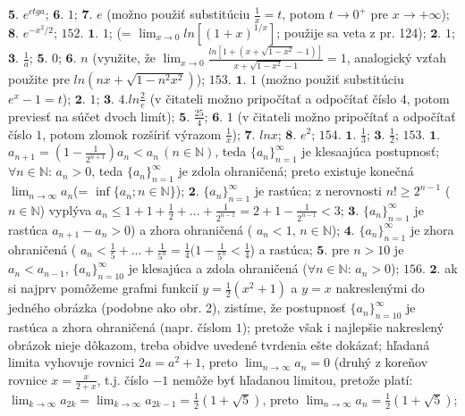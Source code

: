 $\boldsymbol{5.}$  $e^{ctg a} $;
$\boldsymbol{6.}$  $1 $;
$\boldsymbol{7.}$  $e $ (možno použiť substitúciu $\frac{1}{x}=t $, potom $t\rightarrow 0^{+} $ pre $x \rightarrow +\infty $);
$\boldsymbol{8.}$  $e^{-x^{2}/2} $;
$\boxed{152.}$
$\boldsymbol{1.}$  $1 $; (= $\lim_{x\rightarrow 0} ln[(1+x)^{1/x}  ] $; použije sa veta z pr. 124);
$\boldsymbol{2.}$  $1 $;
$\boldsymbol{3.}$  $\frac{1}{a} $; 
$\boldsymbol{5.}$  $0 $;
$\boldsymbol{6.}$  $n $ (využite, že $\lim_{x\rightarrow 0} \frac {ln [1+(x+ \sqrt{1-x^{2}}-1)]}{x+\sqrt{1-x^{2}}-1} =1$, analogický vzťah použite pre $ln (nx+ \sqrt{1-n^{2}x^{2}}) $);   
$\boxed{153.}$
$\boldsymbol{1.}$  $1 $ (možno použiť substitúciu  $e^{x}-1=t  $);
$\boldsymbol{2.}$  $1 $;
$\boldsymbol{3.}$  $4. ln \frac{2}{e} $ (v čitateli možno pripočítať a odpočítať číslo $4$, potom previesť na súčet dvoch limít);
$\boldsymbol{5.}$  $\frac{25}{4} $;
$\boldsymbol{6.}$  $1 $ (v čitateli možno pripočítať a odpočítať číslo $1$, potom zlomok rozšíriť výrazom $\frac{1}{x}$);
$\boldsymbol{7.}$  $ln x $;
$\boldsymbol{8.}$  $e^{2} $;
$\boxed{154.}$
$\boldsymbol{1.}$  $\frac{1}{3} $;
$\boldsymbol{3.}$  $\frac{1}{2} $;
$\boxed{153.}$
$\boldsymbol{1.}$  $a_{n+1}=(1-\frac{1}{2^{n+1}}) a_{n} < a_{n} \, (n \in \mathbb{N}) $, teda $ \lbrace a_{n} \rbrace_{n=1}^\infty $ je klesaajúca postupnosť; $ \forall n \in \mathbb{N}: \, a_{n} 	>0 $, teda $ \lbrace a_{n} \rbrace_{n=1}^\infty $  je zdola ohraničená; preto existuje konečná  $\lim_{n\rightarrow \infty} a_{n}  $(= $\inf \lbrace a_{n} ; n \in \mathbb{N}\rbrace $);
$\boldsymbol{2.}$ $ \lbrace a_{n} \rbrace_{n=1}^\infty $ je rastúca; z nerovnosti  $n!\geq 2^{n-1}  $ ($n \in \mathbb{N}  $) vyplýva  $a_{n}\leq 1+1+\frac{1}{2}+...+\frac{1}{2^{n-1}} = 2+1-\frac{1}{2^{n-1}} < 3$;
$\boldsymbol{3.}$ $\lbrace a_{n}\rbrace_{n=1}^{\infty}  $  je rastúca $a_{n+1}-a_{n}>0  $) a zhora ohraničená ( $a_{n} < 1,\, n \in \mathbb{N} $);
$\boldsymbol{4.}$ $\lbrace a_{n}\rbrace_{n=1}^{\infty}  $  je zhora ohraničená ( $a_{n} < \frac{1}{5}+...+ \frac{1}{5^{n}} = \frac{1}{4}(1- \frac{1}{5^{n}} < \frac{1}{4}$) a rastúca;
$\boldsymbol{5.}$ pre $n>10 $ je $a_{n}< a_{n-1} $, $\lbrace a_{n}\rbrace_{n=10}^{\infty} $ je klesajúca a zdola ohraničená  ($ \forall n \in \mathbb{N}: \, a_{n} 	>0 $);
$\boxed{156.}$
$\boldsymbol{2.}$ ak si najprv pomôžeme grafmi funkcií $y=\frac{1}{2}(x^{2}+1) $  a   $y=x $ nakreslenými do jedného obrázka (podobne ako obr. 2), zistíme, že postupnosť $\lbrace a_{n}\rbrace_{n=10}^{\infty} $ je rastúca a zhora ohraničená (napr. číslom  $ 1 $); pretože však i najlepšie nakreslený obrázok nieje dôkazom, treba obidve uvedené tvrdenia ešte dokázať; hľadaná limita vyhovuje rovnici  $ 2a=a^{2}+1 $, preto $\lim_{n\rightarrow \infty} a_{n} =0$ (druhý z koreňov rovnice $x= \frac{x}{2+x} $, t.j. číslo $-1$ nemôže byť hľadanou limitou, pretože platí: $\lim_{k\rightarrow \infty} a_{2k} = \lim_{k\rightarrow \infty} a_{2k-1}= \frac{1}{2}(1+\sqrt{5})$, preto $\lim_{n\rightarrow \infty} a_{n} = \frac{1}{2}(1+\sqrt{5})$;
